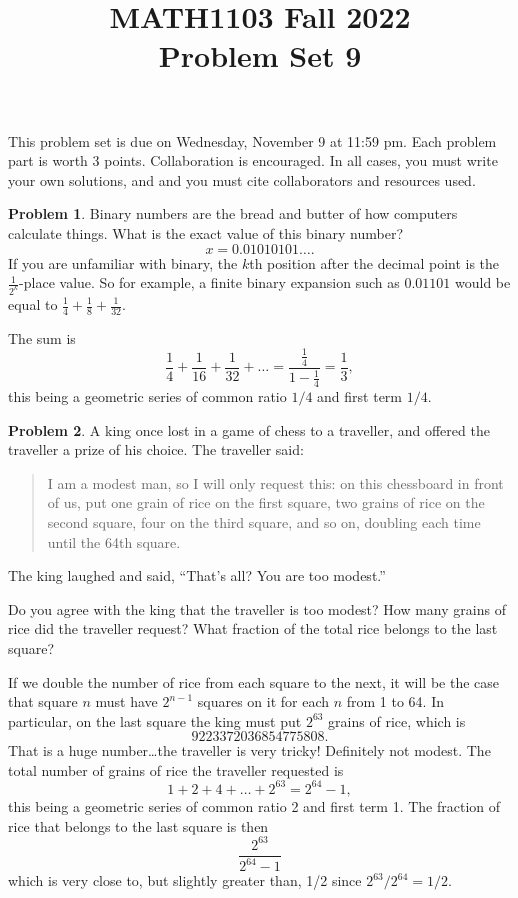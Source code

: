 \documentclass[11pt,oneside]{amsart}
\title{MATH1103 Fall 2022\\
Problem Set 9}
\theoremstyle{definition}
\newtheorem{problem}{Problem}
\theoremstyle{plain}
\begin{document}
    \maketitle
    This problem set is due on Wednesday, November 9 at 11:59 pm. Each problem part is worth 3 points. Collaboration is encouraged. In all cases, you must write your own solutions, and and you must cite collaborators and resources used.

    \begin{problem}
        Binary numbers are the bread and butter of how computers calculate things. What is the exact value of this binary number?
        \[x=0.01010101\ldots.\]
        If you are unfamiliar with binary, the $k$th position after the decimal point is the $\frac 1{2^k}$-place value. So for example, a finite binary expansion such as $0.01101$ would be equal to $\frac 14+\frac 18+\frac 1{32}$.
    \end{problem}
    \begin{solution}
        The sum is
        \[\frac 14+\frac 1{16}+\frac 1{32}+\dots=\frac{\frac 14}{1-\frac 14}=\frac 13,\]
        this being a geometric series of common ratio $1/4$ and first term $1/4$.
    \end{solution}

    \begin{problem}
        A king once lost in a game of chess to a traveller, and offered the traveller a prize of his choice. The traveller said:
        \begin{quote}
            I am a modest man, so I will only request this: on this chessboard in front of us, put one grain of rice on the first square, two grains of rice on the second square, four on the third square, and so on, doubling each time until the 64th square.
        \end{quote}

        The king laughed and said, ``That's all? You are too modest.''
        
        Do you agree with the king that the traveller is too modest? How many grains of rice did the traveller request? What fraction of the total rice belongs to the last square?
    \end{problem}
    \begin{solution}
        If we double the number of rice from each square to the next, it will be the case that square $n$ must have $2^{n-1}$ squares on it for each $n$ from 1 to 64. In particular, on the last square the king must put $2^{63}$ grains of rice, which is
        \[9223372036854775808.\]
        That is a huge number\dots the traveller is very tricky! Definitely not modest. The total number of grains of rice the traveller requested is
        \[1+2+4+\dots+2^{63}=2^{64}-1,\]
        this being a geometric series of common ratio 2 and first term 1. The fraction of rice that belongs to the last square is then
        \[\frac{2^{63}}{2^{64}-1}\]
        which is very close to, but slightly greater than, 1/2 since $2^{63}/2^{64}=1/2$.
    \end{solution}
\end{document}
